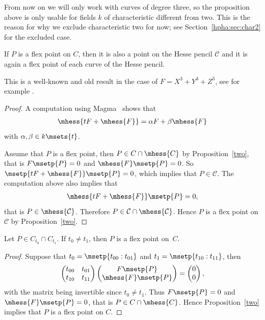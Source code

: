 From now on we will only work with curves of degree three, so the proposition above is only usable for fields $k$ of characteristic different from two. This is the reason for why we exclude characteristic two for now; see Section~\ref{hpha:sec:char2} for the excluded case.

\begin{Corollary}\label{corthree} If $P$ is a flex point on $C$, then it is also a point on the Hesse pencil $\mathcal{C}$ and it is again a flex point of each curve of the Hesse pencil.
\end{Corollary}

This is a well-known and old result in the case of $F=X^3+Y^3+Z^3$, see for example \cite[Section~VII.1]{pascal1902}.

\begin{proof}A computation using Magma~\cite{bosma1997} shows that
\begin{gather*}
\mhess{tF+\mhess{F}} =\alpha F+\beta \mhess{F}
\end{gather*}
with $\alpha,\beta\in k\msets{t}$.

Assume that $P$ is a flex point, then $P\in C\cap\mhess{C}$ by Proposition~\ref{two}, that is $F\msetp{P}=0$ and $\mhess{F}\msetp{P}=0$. So $\msetp{tF+\mhess{F}}\msetp{P}=0$, which implies that $P\in\mathcal{C}$. The computation above also implies that
\begin{gather*}
\mhess{tF+\mhess{F}}\msetp{P}=0,
\end{gather*}
that is $P\in\mhess{\mathcal{C}}$. Therefore $P\in\mathcal{C}\cap\mhess{\mathcal{C}}$. Hence $P$ is a flex point on $\mathcal{C}$ by Proposi\-tion~\ref{two}.
\end{proof}

\begin{Corollary}\label{hpga:cor:cphpfp}
Let $P\in C_{t_0}\cap C_{t_1}$. If $t_0\neq t_1$, then $P$ is a flex point on~$C$.
\end{Corollary}
\begin{proof}
Suppose that $t_0=\msetp{t_{00}:t_{01}}$ and $t_1=\msetp{t_{10}:t_{11}}$, then
\begin{gather*}
\begin{pmatrix}
t_{00} & t_{01} \\
t_{10} & t_{11}
\end{pmatrix}
\begin{pmatrix}
F\msetp{P} \\
\mhess{F}\msetp{P}
\end{pmatrix}
=
\begin{pmatrix}
0 \\
0
\end{pmatrix},
\end{gather*}
with the matrix being invertible since $t_0\neq t_1$. Thus $F\msetp{P}=0$ and $\mhess{F}\msetp{P}=0$, that is $P\in C\cap\mhess{C}$. Hence Proposition~\ref{two} implies that $P$ is a flex point on $C$.
\end{proof}

